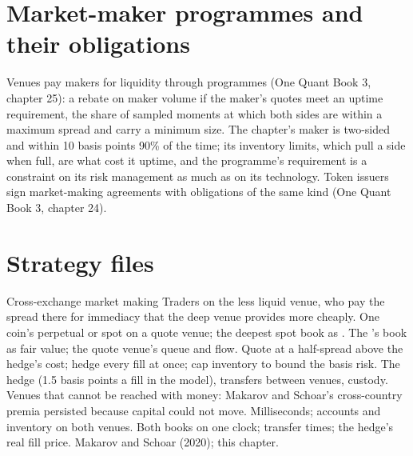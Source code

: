 \section{Market-maker programmes and their obligations}

Venues pay makers for liquidity through programmes (One Quant Book 3, chapter 25): a rebate on maker volume if the maker's quotes meet an uptime
requirement, the share of sampled moments at which both sides are within a maximum spread and carry a minimum size. The chapter's maker is two-sided
and within 10 basis points 90\% of the time; its inventory limits, which pull a side when full, are what cost it uptime, and the programme's
requirement is a constraint on its risk management as much as on its technology. Token issuers sign market-making agreements with obligations of
the same kind (One Quant Book 3, chapter 24).

\section{Strategy files}

\begin{strategyfile}{Cross-exchange market making}\label{strat:hf:crypto-high-frequency-trading-on-centralised-venues:xmm}
 Traders on the less liquid venue, who pay the spread there for immediacy that the deep venue provides more cheaply.
 One coin's perpetual or spot on a quote venue; the deepest spot book as .
 The 's book as fair value; the quote venue's queue and flow.
 Quote at a half-spread above the hedge's cost; hedge every fill at once; cap inventory to bound the basis risk.
 The hedge (1.5 basis points a fill in the model), transfers between venues, custody.
 Venues that cannot be reached with money: Makarov and Schoar's cross-country premia persisted because capital could not move.
 Milliseconds; accounts and inventory on both venues.
 Both books on one clock; transfer times; the hedge's real fill price.
 Makarov and Schoar (2020); this chapter.
\end{strategyfile}

